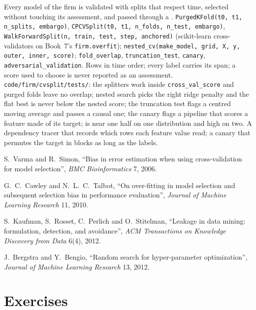 \begin{build}
 Every model of the firm is validated with splits that respect time, selected without touching its
assessment, and passed through a .
 \texttt{PurgedKFold(t0, t1, n\_splits, embargo)}, \texttt{CPCVSplit(t0, t1, n\_folds, n\_test,
embargo)}, \texttt{WalkForwardSplit(n, train, test, step, anchored)} (scikit-learn cross-validators on Book~7's
\texttt{firm.overfit}); \texttt{nested\_cv(make\_model, grid, X, y, outer, inner, score)};
\texttt{fold\_overlap}, \texttt{truncation\_test}, \texttt{canary}, \texttt{adversarial\_validation}.
 Rows in time order; every label carries its span; a score used to choose is never reported as an
assessment.
 \texttt{code/firm/cvsplit/tests/}: the splitters work inside \texttt{cross\_val\_score} and
purged folds leave no overlap; nested search picks the right ridge penalty and the flat best is never below the nested
score; the truncation test flags a centred moving average and passes a causal one; the canary flags a pipeline that
scores a feature made of its target;  is near one half on one distribution and high on two.
 A dependency tracer that records which rows each feature value read; a canary that permutes the target
in blocks as long as the labels.
\end{build}

\begin{omsources}
\item S.~Varma and R.~Simon, ``Bias in error estimation when using cross-validation for model selection'', \emph{BMC
Bioinformatics} 7, 2006.
\item G.~C.~Cawley and N.~L.~C.~Talbot, ``On over-fitting in model selection and subsequent selection bias in performance
evaluation'', \emph{Journal of Machine Learning Research} 11, 2010.
\item S.~Kaufman, S.~Rosset, C.~Perlich and O.~Stitelman, ``Leakage in data mining: formulation, detection, and
avoidance'', \emph{ACM Transactions on Knowledge Discovery from Data} 6(4), 2012.
\item J.~Bergstra and Y.~Bengio, ``Random search for hyper-parameter optimization'', \emph{Journal of Machine Learning
Research} 13, 2012.
\end{omsources}

\section{Exercises}

